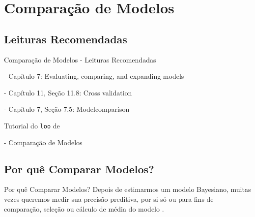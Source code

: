 \section{Comparação de Modelos}

\subsection{Leituras Recomendadas}
\begin{frame}{Comparação de Modelos - Leituras Recomendadas}
    \begin{vfilleditems}
        \item \textcite{gelman2013bayesian} - Capítulo 7: Evaluating, comparing, and expanding models
        \item \textcite{gelman2020regression} - Capítulo 11, Seção 11.8: Cross validation
        \item \textcite{mcelreath2020statistical} - Capítulo 7, Seção 7.5: Modelcomparison
        \item \textcite{vehtariPracticalBayesianModel2015}
        \item Tutorial do \texttt{loo} de \textcite{loo}
        \item \textcite{storopoli2021estatisticabayesianaR} - Comparação de Modelos
        \item \textcite{spiegelhalter2002bayesian}
        \item \textcite{van2005dic}
        \item \textcite{watanabe2010asymptotic}
        \item \textcite{gelfand1996model}
        \item \textcite{watanabe2010asymptotic}
        \item \textcite{geisser1979predictive}
    \end{vfilleditems}
\end{frame}

\subsection{Por quê Comparar Modelos?}
\begin{frame}{Por quê Comparar Modelos?}
    Depois de estimarmos um modelo Bayesiano,
    muitas vezes queremos medir sua precisão preditiva, por si só ou para
    fins de comparação, seleção ou cálculo de média do modelo \parencite{geisser1979predictive}.
\end{frame}

